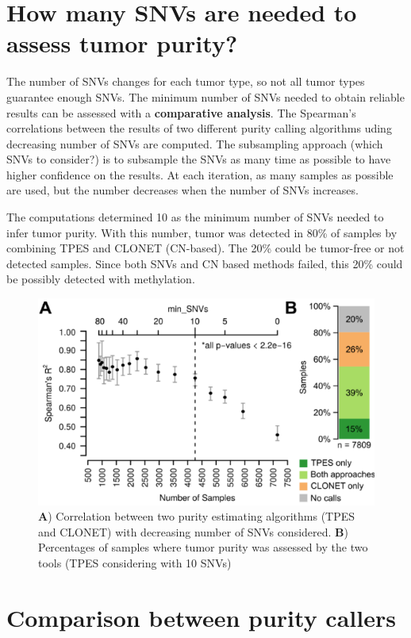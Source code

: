 \section{How many SNVs are needed to assess tumor purity?}

The number of SNVs changes for each tumor type, so not all tumor types guarantee enough SNVs. The minimum number of SNVs needed to obtain reliable results can be assessed with a \textbf{comparative analysis}. The Spearman's correlations between the results of two different purity calling algorithms uding decreasing number of SNVs are computed. The subsampling approach (which SNVs to consider?) is to subsample the SNVs as many time as possible to have higher confidence on the results. At each iteration, as many samples as possible are used, but the number decreases when the number of SNVs increases.

The computations determined 10 as the minimum number of SNVs needed to infer tumor purity. With this number, tumor was detected in 80\% of samples by combining TPES and CLONET (CN-based). The 20\% could be tumor-free or not detected samples. Since both SNVs and CN based methods failed, this 20\% could be possibly detected with methylation.

\begin{figure}[!ht]
\centering
    \includegraphics[width=0.7\linewidth]{comparative.png}
    \caption{\label{fig:comp}\textbf{A}) Correlation between two purity estimating algorithms (TPES and CLONET) with decreasing number of SNVs considered. \textbf{B}) Percentages of samples where tumor purity was assessed by the two tools (TPES considering with 10 SNVs)}
\end{figure}


\section{Comparison between purity callers}

